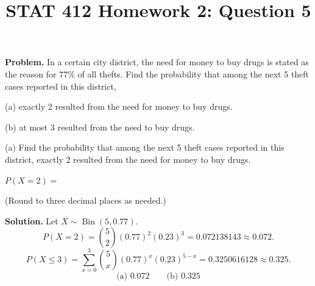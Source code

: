 \documentclass[11pt]{article}
\title{STAT 412 Homework 2: Question 5}
\author{}
\date{}
\begin{document}
\maketitle
\textbf{Problem.} In a certain city district, the need for money to buy drugs
is stated as the reason for 77\% of all thefts. Find the probability that among
the next 5 theft cases reported in this district,

(a) exactly 2 resulted from the need for money to buy drugs.

(b) at most 3 resulted from the need to buy drugs.

(a) Find the probability that among the next 5 theft cases reported in this
district, exactly 2 resulted from the need for money to buy drugs.

\(P(X=2)=\boxed{\phantom{0.000}}\)

(Round to three decimal places as needed.)

\textbf{Solution.} Let \(X\sim\operatorname{Bin}(5,0.77)\).
\[
P(X=2)=\binom52(0.77)^2(0.23)^3=0.072138143\approx0.072.
\]
\[
P(X\le3)=\sum_{x=0}^{3}\binom5x(0.77)^x(0.23)^{5-x}
=0.3250616128\approx0.325.
\]
\[
\boxed{\text{(a) }0.072\qquad\text{(b) }0.325}
\]
\end{document}

